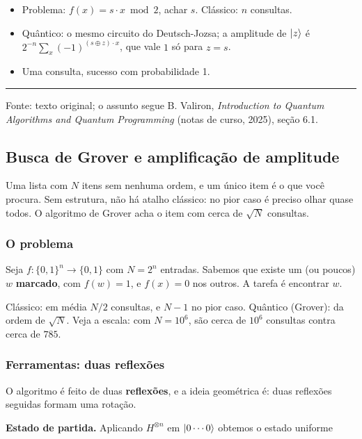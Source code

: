 \begin{itemize}
\tightlist
\item
  Problema: \(f(x)=s\cdot x\bmod2\), achar \(s\). Clássico: \(n\) consultas.
\item
  Quântico: o mesmo circuito do Deutsch-Jozsa; a amplitude de \(\left|{z}\right>\) é \(2^{-n}\sum_x(-1)^{(s\oplus z)\cdot x}\), que vale \(1\) só para \(z=s\).
\item
  Uma consulta, sucesso com probabilidade 1.
\end{itemize}

\begin{center}\rule{0.5\linewidth}{0.5pt}\end{center}

Fonte: texto original; o assunto segue B. Valiron, \emph{Introduction to Quantum Algorithms and Quantum Programming} (notas de curso, 2025), seção 6.1.

\subsection{Busca de Grover e amplificação de amplitude}
Uma lista com \(N\) itens sem nenhuma ordem, e um único item é o que você procura. Sem estrutura, não há atalho clássico: no pior caso é preciso olhar quase todos. O algoritmo de Grover acha o item com cerca de \(\sqrt N\) consultas.

\subsubsection{O problema}\label{o-problema}

Seja \(f:\{0,1\}^n\to\{0,1\}\) com \(N=2^n\) entradas. Sabemos que existe um (ou poucos) \(w\) \textbf{marcado}, com \(f(w)=1\), e \(f(x)=0\) nos outros. A tarefa é encontrar \(w\).

Clássico: em média \(N/2\) consultas, e \(N-1\) no pior caso. Quântico (Grover): da ordem de \(\sqrt N\). Veja a escala: com \(N=10^6\), são cerca de \(10^6\) consultas contra cerca de \(785\).

\subsubsection{Ferramentas: duas reflexões}\label{ferramentas-duas-reflexuxf5es}

O algoritmo é feito de duas \textbf{reflexões}, e a ideia geométrica é: duas reflexões seguidas formam uma rotação.

\textbf{Estado de partida.} Aplicando \(H^{\otimes n}\) em \(\left|{0\cdots0}\right>\) obtemos o estado uniforme

